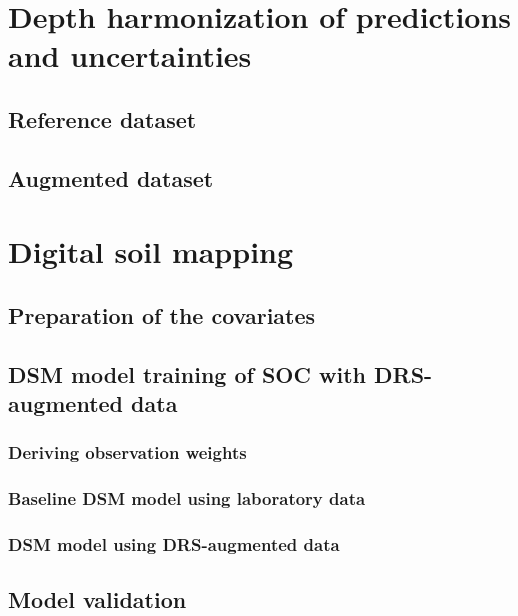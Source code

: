 \documentclass[
  10pt,
  b5paper,
  oneside]{book}
\begin{document}
\section{Depth harmonization of predictions and uncertainties}\label{depth-harmonization-of-predictions-and-uncertainties}

\subsection{Reference dataset}\label{reference-dataset}

\subsection{Augmented dataset}\label{augmented-dataset}

\section{Digital soil mapping}\label{digital-soil-mapping-1}

\subsection{Preparation of the covariates}\label{preparation-of-the-covariates}

\subsection{DSM model training of SOC with DRS-augmented data}\label{dsm-model-training-of-soc-with-drs-augmented-data}

\subsubsection{Deriving observation weights}\label{deriving-observation-weights}

\subsubsection{Baseline DSM model using laboratory data}\label{baseline-dsm-model-using-laboratory-data}

\subsubsection{DSM model using DRS-augmented data}\label{dsm-model-using-drs-augmented-data}

\subsection{Model validation}\label{model-validation}
\end{document}
